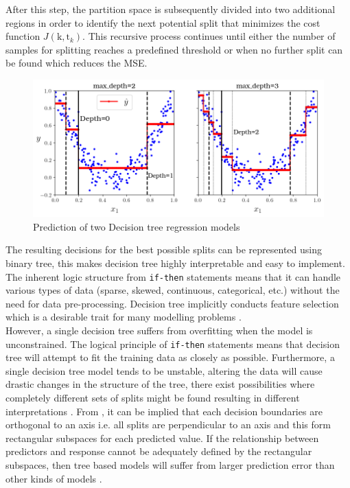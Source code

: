 After this step, the partition space is subsequently divided into two additional regions in order to identify the next potential split that minimizes the cost function $J(\text{k},\text{t}_k)$. This recursive process continues until either the number of samples for splitting reaches a predefined threshold or when no further split can be found which reduces the MSE.\\


\begin{figure}[h]
    \centering
    \includegraphics[width=.9\textwidth]{02_figures/fig6_5_partspace_geron09.png}
    \caption{Prediction of two Decision tree regression models }
    \label{fig:geron6_5}
\end{figure}

The resulting decisions for the best possible splits can be represented using binary tree, this makes decision tree highly interpretable and easy to implement. The inherent logic structure from {\tt if-then} statements means that it can handle various types of data (sparse, skewed, continuous, categorical, etc.) without the need for data pre-processing. Decision tree implicitly conducts feature selection which is a desirable trait for many modelling problems .\\

However, a single decision tree suffers from overfitting when the model is unconstrained. The logical principle of {\tt if-then} statements means that decision tree will attempt to fit the training data as closely as possible. Furthermore, a single decision tree model tends to be unstable, altering the data will cause drastic changes in the structure of the tree, there exist possibilities where completely different sets of splits might be found resulting in different interpretations . From , it can be implied that each decision boundaries are orthogonal to an axis i.e. all splits are perpendicular to an axis and this form rectangular subspaces for each predicted value. If the relationship between predictors and response cannot be adequately defined by the rectangular subspaces, then tree based models will suffer from larger prediction error than other kinds of models .\\

